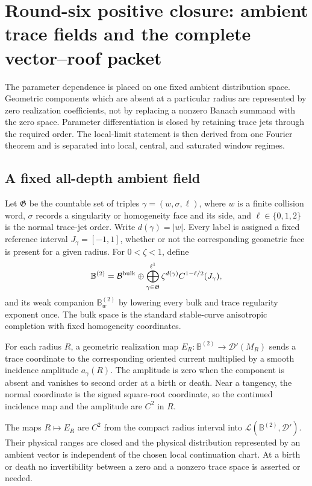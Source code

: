 \section{Round-six positive closure: ambient trace fields and the complete vector--roof packet}
\label{sec:r6-a2}

The parameter dependence is placed on one fixed ambient distribution space.
Geometric components which are absent at a particular radius are represented
by zero realization coefficients, not by replacing a nonzero Banach summand
with the zero space.  Parameter differentiation is closed by retaining trace
jets through the required order.  The local-limit statement is then derived
from one Fourier theorem and is separated into local, central, and saturated
window regimes.

\subsection{A fixed all-depth ambient field}

Let \(\mathfrak G\) be the countable set of triples
\(\gamma=(w,\sigma,\ell)\), where \(w\) is a finite collision word,
\(\sigma\) records a singularity or homogeneity face and its side, and
\(\ell\in\{0,1,2\}\) is the normal trace-jet order.  Write
\(d(\gamma)=|w|\).  Every label is assigned a fixed reference interval
\(J_\gamma=[-1,1]\), whether or not the corresponding geometric face is
present for a given radius.  For \(0<\zeta<1\), define
\[
\mathbb B^{(2)}=
\mathcal B^{\rm bulk}\oplus
\bigoplus_{\gamma\in\mathfrak G}^{\ell^1}
\zeta^{d(\gamma)}C^{1-\ell/2}(J_\gamma),
\]
and its weak companion \(\mathbb B_w^{(2)}\) by lowering every bulk and trace
regularity exponent once.  The bulk space is the standard stable-curve
anisotropic completion with fixed homogeneity coordinates.

For each radius \(R\), a geometric realization map
\(E_R:\mathbb B^{(2)}\to\mathscr D'(M_R)\) sends a trace coordinate to the
corresponding oriented current multiplied by a smooth incidence amplitude
\(a_\gamma(R)\).  The amplitude is zero when the component is absent and
vanishes to second order at a birth or death.  Near a tangency, the normal
coordinate is the signed square-root coordinate, so the continued incidence
map and the amplitude are \(C^2\) in \(R\).

\begin{lemma}
\label{lem:r6-a2-ambient}
The maps \(R\mapsto E_R\) are \(C^2\) from the compact radius interval into
\(\mathcal L(\mathbb B^{(2)},\mathscr D')\).  Their physical ranges are
closed and the physical distribution represented by an ambient vector is
independent of the chosen local continuation chart.  At a birth or death no
invertibility between a zero and a nonzero trace space is asserted or needed.
\end{lemma}

